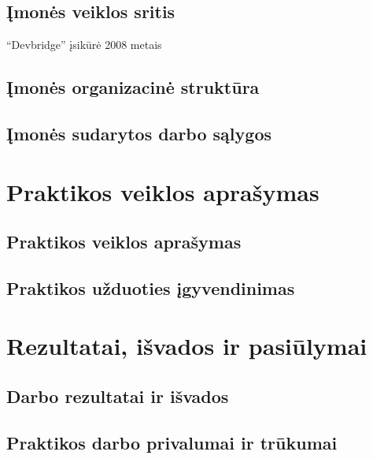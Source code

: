 \documentclass{VUMIFPSPraktika}
\begin{document}
\subsection{Įmonės veiklos sritis}
\enquote{Devbridge} įsikūrė 2008 metais 
\subsection{Įmonės organizacinė struktūra}
\subsection{Įmonės sudarytos darbo sąlygos}

\section{Praktikos veiklos aprašymas}
\subsection{Praktikos veiklos aprašymas}
\subsection{Praktikos užduoties įgyvendinimas}

\section{Rezultatai, išvados ir pasiūlymai}
\subsection{Darbo rezultatai ir išvados}
\subsection{Praktikos darbo privalumai ir trūkumai}
\end{document}
